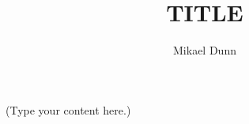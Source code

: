 \documentclass{article}
\begin{document}
 
\title{TITLE}
\author{Mikael Dunn}
\maketitle
(Type your content here.)
\end{document}
